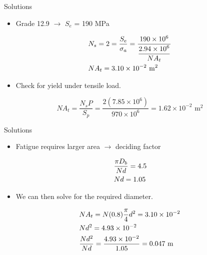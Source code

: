 \documentclass[10pt, svgnames]{beamer}
\begin{document}
\begin{frame}[label={sec:org5a96309}]{Solutions}
\begin{itemize}
\item Grade 12.9 $\rightarrow$ $S_e$ = 190 MPa
\end{itemize}

\[\begin{gathered}
   {N_s} = 2 = \frac{{{S_e}}}{{{\sigma _a}}} = \frac{{190 \times {{10}^6}}}{{\dfrac{{2.94 \times {{10}^6}}}{{N{A_t}}}}} \hfill \\
   N{A_t} = 3.10 \times 10^{ - 2} \text{ m}^2 \hfill \\
 \end{gathered} \]

\begin{itemize}
\item Check for yield under tensile load.
\end{itemize}

\[N{A_t} = \frac{{{N_s}P}}{{{S_p}}} = \frac{{2(7.85 \times {{10}^6})}}{{970 \times {{10}^6}}} = 1.62 \times {10^{ - 2}} \text{ m}^2\]
\end{frame}

\begin{frame}[label={sec:org0d2bc36}]{Solutions}
\begin{itemize}
  \item Fatigue requires larger area $\rightarrow$ deciding factor
\end{itemize}

\[\begin{gathered}
   \frac{{\pi {D_b}}}{{Nd}} = 4.5 \hfill \\
   Nd = 1.05 \hfill \\
 \end{gathered} \]

\begin{itemize}
  \item We can then solve for the required diameter.
\end{itemize}

\[\begin{gathered}
   N{A_t} = N(0.8)\frac{\pi}{4}{d^2} = 3.10 \times {10^{ - 2}} \hfill \\
   N{d^2} = 4.93 \times {10^{ - 2}} \hfill \\
   \frac{Nd^2}{Nd} = \frac{4.93 \times 10^{ - 2}}{1.05} = 0.047 \text{ m} \hfill \\
 \end{gathered} \]
\end{frame}
\end{document}
